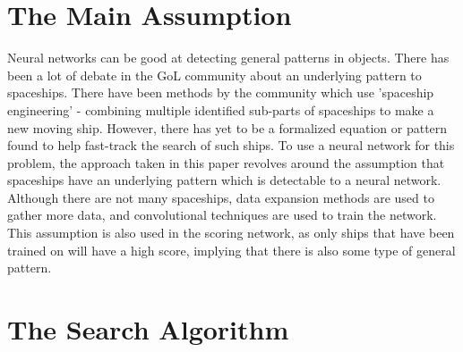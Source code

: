 \documentclass{l4proj}
\begin{document}
\section{The Main Assumption}

Neural networks can be good at detecting general patterns in objects. There has been a lot of debate in the GoL community about an underlying pattern to spaceships. There have been methods by the community which use 'spaceship engineering' - combining multiple identified sub-parts of spaceships to make a new moving ship. However, there has yet to be a formalized equation or pattern found to help fast-track the search of such ships. To use a neural network for this problem, the approach taken in this paper revolves around the assumption that spaceships have an underlying pattern which is detectable to a neural network. Although there are not many spaceships, data expansion methods are used to gather more data, and convolutional techniques are used to train the network. This assumption is also used in the scoring network, as only ships that have been trained on will have a high score, implying that there is also some type of general pattern. 


\section{The Search Algorithm}
\end{document}
